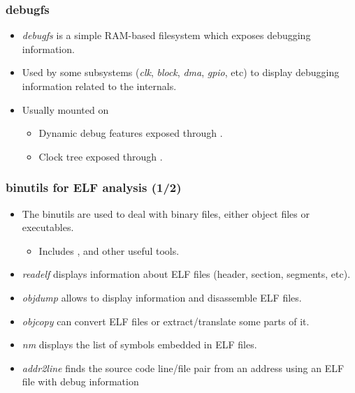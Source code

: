 \begin{frame}
  \frametitle{debugfs}
  \begin{itemize}
    \item {\em debugfs} is a simple RAM-based filesystem which exposes debugging
          information.
    \item Used by some subsystems ({\em clk}, {\em block}, {\em dma}, {\em gpio},
          etc) to
          display debugging information related to the internals.
    \item Usually mounted on 
    \begin{itemize}
      \item Dynamic debug features exposed through .
      \item Clock tree exposed through .
    \end{itemize}
  \end{itemize}
\end{frame}

\begin{frame}[fragile]
  \frametitle{binutils for ELF analysis (1/2)}
  \begin{itemize}
    \item The binutils are used to deal with binary files, either object files
          or executables.
    \begin{itemize}
      \item Includes ,  and other useful tools.
    \end{itemize}
    \item {\em readelf} displays information about ELF files (header, section,
          segments, etc).
    \item {\em objdump} allows to display information and disassemble ELF
          files.
    \item {\em objcopy} can convert ELF files or extract/translate some
          parts of it.
    \item {\em nm} displays the list of symbols embedded in ELF files.
    \item {\em addr2line} finds the source code line/file pair from an address using
          an ELF file with debug information
  \end{itemize}
\end{frame}

